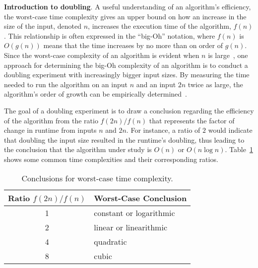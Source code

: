   {\bf Introduction to doubling}. A useful understanding of an algorithm's efficiency, the worst-case time complexity
gives an upper bound on how an increase in the size of the input, denoted $n$, increases the execution time of the
algorithm, $f(n)$.  This relationship is often expressed in the ``big-Oh'' notation, where $f(n)$ is $O(g(n))$ means
that the time increases by no more than on order of $g(n)$. Since the worst-case complexity of an algorithm is evident
when $n$ is large~\cite{mcgeoch2012}, one approach for determining the big-Oh complexity of an algorithm is to conduct
a doubling experiment with increasingly bigger input sizes. By measuring the time needed to run the algorithm on an
input $n$ and an input $2n$ twice as large, the algorithm's order of growth can be
empirically determined~\cite{mcgeoch2012}.

The goal of a doubling experiment is to draw a conclusion regarding the efficiency of the algorithm from the ratio
$f(2n)/f(n)$ that represents the factor of change in runtime from inputs $n$ and $2n$. For instance, a ratio of $2$
would indicate that doubling the input size resulted in the runtime's doubling, thus leading to the conclusion that the
algorithm under study is $O(n)$ or $O(n\log n)$.  Table~\ref{table:ratios} shows some common time complexities and their
corresponding ratios.

\begin{table}[h!]
  \vspace*{-.10in}
  \begin{center}
    \begin{tabular}{c|l}
      Ratio $f(2n)/f(n)$ & Worst-Case Conclusion              \\ \hline
      1                  & constant or logarithmic \\
      2                  & linear or linearithmic  \\
      4                  & quadratic               \\
      8                  & cubic                   \\
    \end{tabular}
  \end{center}
  \vspace*{-.25in}

  \caption{Conclusions for worst-case time complexity.}~\label{table:ratios}
  \vspace*{-.30in}

\end{table}

